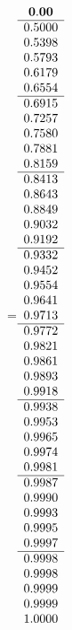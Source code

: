 =\hbox{$\begin{array}{c}
\bf 0.00 
 \\ \hline 
  0.5000 \\ 
  0.5398 \\ 
  0.5793 \\ 
  0.6179 \\ 
  0.6554
 \\ \hline 
  0.6915 \\ 
  0.7257 \\ 
  0.7580 \\ 
  0.7881 \\ 
  0.8159
 \\ \hline 
  0.8413 \\ 
  0.8643 \\ 
  0.8849 \\ 
  0.9032 \\ 
  0.9192
 \\ \hline 
  0.9332 \\ 
  0.9452 \\ 
  0.9554 \\ 
  0.9641 \\ 
  0.9713
 \\ \hline 
  0.9772 \\ 
  0.9821 \\ 
  0.9861 \\ 
  0.9893 \\ 
  0.9918
 \\ \hline 
  0.9938 \\ 
  0.9953 \\ 
  0.9965 \\ 
  0.9974 \\ 
  0.9981
 \\ \hline 
  0.9987 \\ 
  0.9990 \\ 
  0.9993 \\ 
  0.9995 \\ 
  0.9997
 \\ \hline 
  0.9998 \\ 
  0.9998 \\ 
  0.9999 \\ 
  0.9999 \\ 
  1.0000
 \end{array}$}
